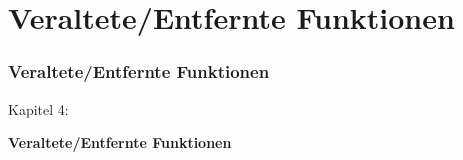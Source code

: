 %

\section{Veraltete/Entfernte Funktionen}
\begin{frame}[fragile]
	\frametitle{Veraltete/Entfernte Funktionen}

	\begin{center}\huge{Kapitel 4:}\end{center}
	\begin{center}\huge{\color{typo3darkgrey}\textbf{Veraltete/Entfernte Funktionen}}\end{center}

\end{frame}

